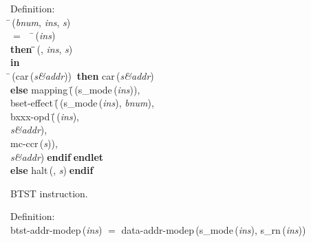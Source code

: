 \begin{tabbing}{\sc Definition}: \\  
\=\,({\it{bnum\/}}, {\it{ins\/}}, {\it{s\/}}) \\ 
$=$$\;\;\;\;$\=\,({\it{ins\/}}) \\ 
{\bf then }\=\=\,({}, {\it{ins\/}}, {\it{s\/}})\- \\ 
{\bf in} \\ 
\=\,({\rm{car}}\,({\it{s\&addr\/}}))$\;\;${\bf then }{\rm{car}}\,({\it{s\&addr\/}}) \\ 
{\bf else }{\rm{mapping}}\,(\=\,({\rm{s\_mode}}\,({\it{ins\/}})), \\ 
{\rm{bset-effect}}\,(\=\,({\rm{s\_mode}}\,({\it{ins\/}}), {\it{bnum\/}}), \\ 
{\rm{bxxx-opd}}\,(\=\,({\it{ins\/}}), \\ 
{\it{s\&addr\/}})\-, \\ 
{\rm{mc-ccr}}\,({\it{s\/}}))\-, \\ 
{\it{s\&addr\/}})\-$\;${\bf  endif}\-$\;${\bf  endlet}\- \\ 
{\bf else }{\rm{halt}}\,({}, {\it{s\/}})$\;${\bf  endif}\-\-
\end{tabbing}

 BTST instruction.
\begin{tabbing}{\sc Definition}: \\  
{\rm{btst-addr-modep}}\,({\it{ins\/}}) $=$ {\rm{data-addr-modep}}\,({\rm{s\_mode}}\,({\it{ins\/}}), {\rm{s\_rn}}\,({\it{ins\/}}))
\end{tabbing}

